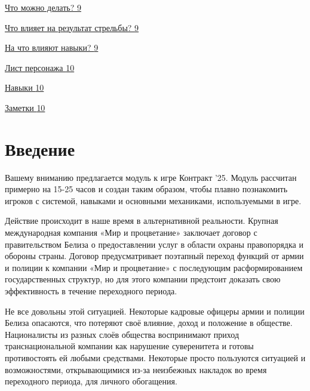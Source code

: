 \documentclass[
]{article}
\begin{document}
\hyperref[ux447ux442ux43e-ux43cux43eux436ux43dux43e-ux434ux435ux43bux430ux442ux44c]{Что
можно делать?
\hyperref[ux447ux442ux43e-ux43cux43eux436ux43dux43e-ux434ux435ux43bux430ux442ux44c]{9}}

\hyperref[ux447ux442ux43e-ux432ux43bux438ux44fux435ux442-ux43dux430-ux440ux435ux437ux443ux43bux44cux442ux430ux442-ux441ux442ux440ux435ux43bux44cux431ux44b]{Что
влияет на результат стрельбы?
\hyperref[ux447ux442ux43e-ux432ux43bux438ux44fux435ux442-ux43dux430-ux440ux435ux437ux443ux43bux44cux442ux430ux442-ux441ux442ux440ux435ux43bux44cux431ux44b]{9}}

\hyperref[ux43dux430-ux447ux442ux43e-ux432ux43bux438ux44fux44eux442-ux43dux430ux432ux44bux43aux438]{На
что влияют навыки?
\hyperref[ux43dux430-ux447ux442ux43e-ux432ux43bux438ux44fux44eux442-ux43dux430ux432ux44bux43aux438]{9}}

\hyperref[ux43bux438ux441ux442-ux43eux442ux440ux44fux434ux430]{Лист
персонажа
\hyperref[ux43bux438ux441ux442-ux43eux442ux440ux44fux434ux430]{10}}

\hyperref[ux43dux430ux432ux44bux43aux438]{Навыки
\hyperref[ux43dux430ux432ux44bux43aux438]{10}}

\hyperref[ux437ux430ux43cux435ux442ux43aux438]{Заметки
\hyperref[ux437ux430ux43cux435ux442ux43aux438]{10}}

\section{Введение}\label{ux432ux432ux435ux434ux435ux43dux438ux435}

Вашему вниманию предлагается модуль к игре Контракт '25. Модуль
рассчитан примерно на 15-25 часов и создан таким образом, чтобы плавно
познакомить игроков с системой, навыками и основными механиками,
используемыми в игре.

Действие происходит в наше время в альтернативной реальности. Крупная
международная компания «Мир и процветание» заключает договор с
правительством Белиза о предоставлении услуг в области охраны
правопорядка и обороны страны. Договор предусматривает поэтапный переход
функций от армии и полиции к компании «Мир и процветание» с последующим
расформированием государственных структур, но для этого компании
предстоит доказать свою эффективность в течение переходного периода.

Не все довольны этой ситуацией. Некоторые кадровые офицеры армии и
полиции Белиза опасаются, что потеряют своё влияние, доход и положение в
обществе. Националисты из разных слоёв общества воспринимают приход
транснациональной компании как нарушение суверенитета и готовы
противостоять ей любыми средствами. Некоторые просто пользуются
ситуацией и возможностями, открывающимися из-за неизбежных накладок во
время переходного периода, для личного обогащения.
\end{document}
